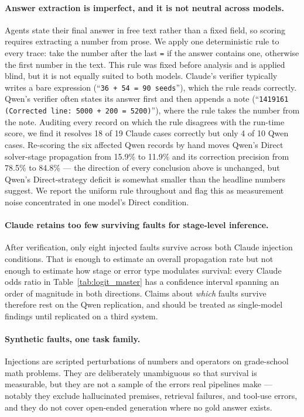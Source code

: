 \documentclass[11pt]{article}
\begin{document}
\paragraph{Answer extraction is imperfect, and it is not neutral across models.}
Agents state their final answer in free text rather than a fixed field, so scoring requires
extracting a number from prose. We apply one deterministic rule to every trace: take the
number after the last \texttt{=} if the answer contains one, otherwise the first number in
the text. This rule was fixed before analysis and is applied blind, but it is not equally
suited to both models. Claude's verifier typically writes a bare expression
(``\texttt{36 + 54 = 90 seeds}''), which the rule reads correctly. Qwen's verifier often
states its answer first and then appends a note (``\texttt{1419161 (Corrected line:
5000 + 200 = 5200)}''), where the rule takes the number from the note. Auditing every
record on which the rule disagrees with the run-time score, we find it resolves 18 of 19
Claude cases correctly but only 4 of 10 Qwen cases. Re-scoring the six affected Qwen
records by hand moves Qwen's Direct solver-stage propagation from 15.9\% to 11.9\% and its
correction precision from 78.5\% to 84.8\% --- the direction of every conclusion above is
unchanged, but Qwen's Direct-strategy deficit is somewhat smaller than the headline numbers
suggest. We report the uniform rule throughout and flag this as measurement noise
concentrated in one model's Direct condition.

\paragraph{Claude retains too few surviving faults for stage-level inference.}
After verification, only eight injected faults survive across both Claude injection
conditions. That is enough to estimate an overall propagation rate but not enough to
estimate how stage or error type modulates survival: every Claude odds ratio in
Table~\ref{tab:logit_master} has a confidence interval spanning an order of magnitude in
both directions. Claims about \emph{which} faults survive therefore rest on the Qwen
replication, and should be treated as single-model findings until replicated on a third
system.

\paragraph{Synthetic faults, one task family.}
Injections are scripted perturbations of numbers and operators on grade-school math
problems. They are deliberately unambiguous so that survival is measurable, but they are
not a sample of the errors real pipelines make --- notably they exclude hallucinated
premises, retrieval failures, and tool-use errors, and they do not cover open-ended
generation where no gold answer exists.
\end{document}
